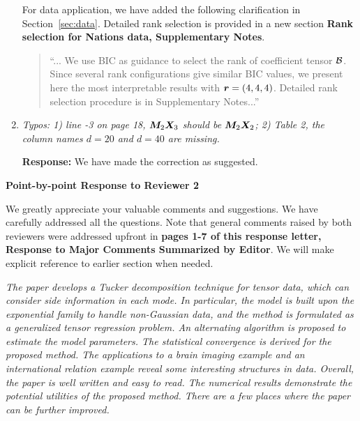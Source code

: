 \documentclass[11pt]{article}
\theoremstyle{plain}
\theoremstyle{definition}
\begin{document}
\begin{enumerate}
 For data application, we have added the following clarification in Section~\ref{sec:data}. Detailed rank selection is provided in a new section {\bf Rank selection for Nations data, Supplementary Notes}. 
   \begin{quote}
   ``... We use BIC as guidance to select the rank of coefficient tensor $\mathcal{B}$. Since several rank configurations give similar BIC values, we present here the most interpretable results with $\bm{r}=(4,4,4)$. Detailed rank selection procedure is in Supplementary Notes...''
\end{quote}

\item \textit{Typos: 1) line -3 on page 18, $\bm M_2 \bm X_3$ should be $\bm M_2\bm X_2$; 2) Table 2, the column names $d = 20$ and $d = 40$ are missing.} 

\textbf{Response:} We have made the correction as suggested.

 
\end{enumerate}

\clearpage
\newpage

\begin{center}
    \textbf{Point-by-point Response to Reviewer 2}
\end{center}

We greatly appreciate your valuable comments and suggestions. We have carefully addressed all the questions. Note that general comments raised by both reviewers were addressed upfront in {\bf pages 1-7 of this response letter, Response to Major Comments Summarized by Editor}. We will make explicit reference to earlier section when needed. 

{\it The paper develops a Tucker decomposition technique for tensor data, which can consider side information in each mode. In particular, the model is built upon the exponential family to handle non-Gaussian data, and the method is formulated as a generalized tensor regression problem. An alternating algorithm is proposed to estimate the model parameters. The statistical convergence is derived for the proposed method. The applications to a brain imaging example and an international relation example reveal some interesting structures in data. Overall, the paper is well written and easy to read. The numerical results demonstrate the potential utilities of the proposed method. There are a few places where the paper can be further improved. }
\end{document}
